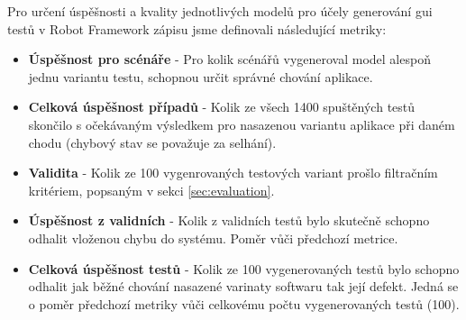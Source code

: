 \documentclass[czech, ma, kiv, he, iso690alph, pdf, viewonly]{fasthesis}
\begin{document}
        Pro určení úspěšnosti a kvality jednotlivých modelů pro účely generování \Acrshort{gui} testů v Robot Framework zápisu jsme definovali následující metriky: 
        \begin{itemize}
            \item \textbf{Úspěšnost pro scénáře} - Pro kolik scénářů vygeneroval model alespoň jednu variantu testu, schopnou určit správné chování aplikace.
            \item \textbf{Celková úspěšnost případů} - Kolik ze všech 1400 spuštěných testů skončilo s očekávaným výsledkem pro nasazenou variantu aplikace při daném chodu (chybový stav se považuje za selhání).
            \item \textbf{Validita} - Kolik ze 100 vygenrovaných testových variant prošlo filtračním kritériem, popsaným v sekci \ref{sec:evaluation}. 
            \item \textbf{Úspěšnost z validních} - Kolik z validních testů bylo skutečně schopno odhalit vloženou chybu do systému. Poměr vůči předchozí metrice.
            \item \textbf{Celková úspěšnost testů} - Kolik ze 100 vygenerovaných testů bylo schopno odhalit jak běžné chování nasazené varinaty softwaru tak její defekt. Jedná se o poměr předchozí metriky vůči celkovému počtu vygenerovaných testů (100).
        \end{itemize}
\end{document}
